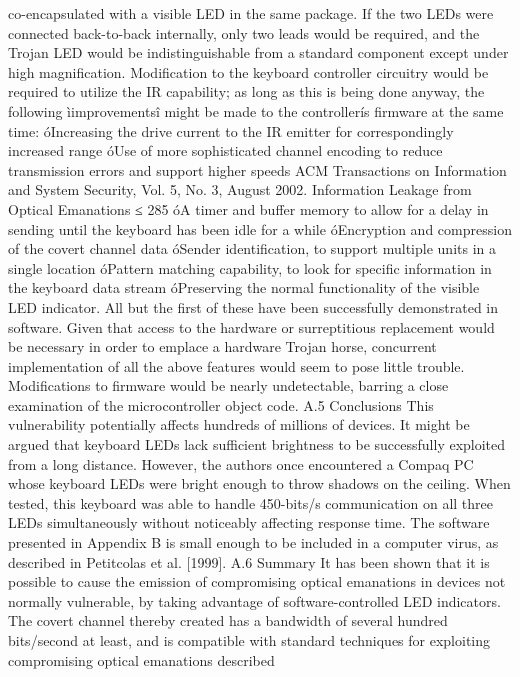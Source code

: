 co-encapsulated with a visible LED in the same package. If the two LEDs were 
connected back-to-back internally, only two leads would be required, and the 
Trojan LED would be indistinguishable from a standard component except under 
high magnification. Modification to the keyboard controller circuitry would 
be required to utilize the IR capability; as long as this is being done anyway, 
the following ìimprovementsî might be made to the controllerís firmware at the 
same time: 
óIncreasing the drive current to the IR emitter for correspondingly increased 
range 
óUse of more sophisticated channel encoding to reduce transmission errors 
and support higher speeds 
ACM Transactions on Information and System Security, Vol. 5, No. 3, August 2002.
Information Leakage from Optical Emanations ≤ 285 
óA timer and buffer memory to allow for a delay in sending until the keyboard 
has been idle for a while 
óEncryption and compression of the covert channel data 
óSender identification, to support multiple units in a single location 
óPattern matching capability, to look for specific information in the keyboard 
data stream 
óPreserving the normal functionality of the visible LED indicator. 
All but the first of these have been successfully demonstrated in software. 
Given that access to the hardware or surreptitious replacement would be necessary 
in order to emplace a hardware Trojan horse, concurrent implementation 
of all the above features would seem to pose little trouble. Modifications 
to firmware would be nearly undetectable, barring a close examination of the 
microcontroller object code. 
A.5 Conclusions 
This vulnerability potentially affects hundreds of millions of devices. It might 
be argued that keyboard LEDs lack sufficient brightness to be successfully exploited 
from a long distance. However, the authors once encountered a Compaq 
PC whose keyboard LEDs were bright enough to throw shadows on the ceiling. 
When tested, this keyboard was able to handle 450-bits/s communication on 
all three LEDs simultaneously without noticeably affecting response time. The 
software presented in Appendix B is small enough to be included in a computer 
virus, as described in Petitcolas et al. [1999]. 
A.6 Summary 
It has been shown that it is possible to cause the emission of compromising 
optical emanations in devices not normally vulnerable, by taking advantage 
of software-controlled LED indicators. The covert channel thereby created has 
a bandwidth of several hundred bits/second at least, and is compatible with 
standard techniques for exploiting compromising optical emanations described 
